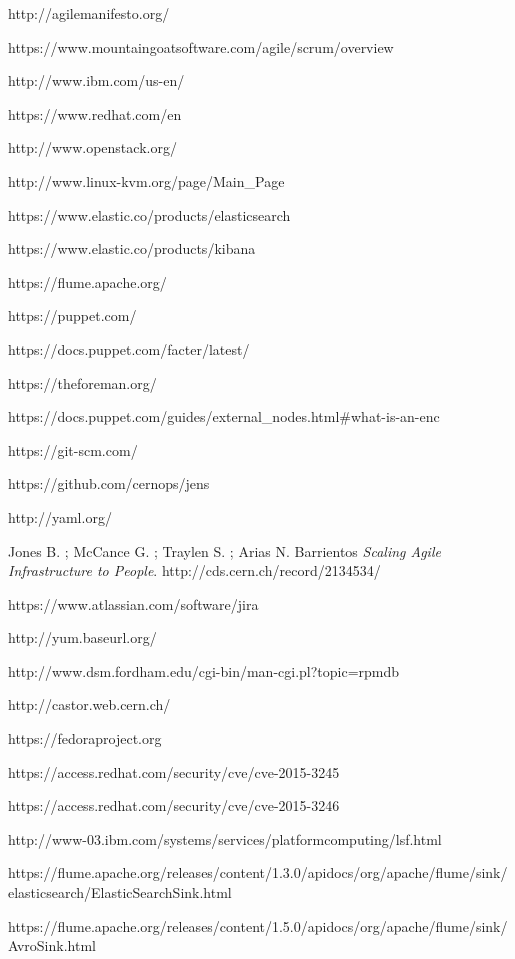 
\begin{thebibliography}{90}
\rhead[\fancyplain{}{\bfseries \leftmark}]{\fancyplain{}{\bfseries
\thepage}}

http://agilemanifesto.org/

https://www.mountaingoatsoftware.com/agile/scrum/overview

http://www.ibm.com/us-en/

https://www.redhat.com/en

http://www.openstack.org/

http://www.linux-kvm.org/page/Main\_Page

https://www.elastic.co/products/elasticsearch

https://www.elastic.co/products/kibana

https://flume.apache.org/

https://puppet.com/

https://docs.puppet.com/facter/latest/

https://theforeman.org/

https://docs.puppet.com/guides/external\_nodes.html\#what-is-an-enc

https://git-scm.com/

https://github.com/cernops/jens

http://yaml.org/

Jones B. ; McCance G. ; Traylen S. ; Arias N. Barrientos 
\textit{Scaling Agile Infrastructure to People}.
http://cds.cern.ch/record/2134534/

https://www.atlassian.com/software/jira

http://yum.baseurl.org/

http://www.dsm.fordham.edu/cgi-bin/man-cgi.pl?topic=rpmdb

http://castor.web.cern.ch/

https://fedoraproject.org

https://access.redhat.com/security/cve/cve-2015-3245

https://access.redhat.com/security/cve/cve-2015-3246

http://www-03.ibm.com/systems/services/platformcomputing/lsf.html

https://flume.apache.org/releases/content/1.3.0/apidocs/org/apache/flume/sink/elasticsearch/ElasticSearchSink.html

https://flume.apache.org/releases/content/1.5.0/apidocs/org/apache/flume/sink/AvroSink.html




\end{thebibliography}
